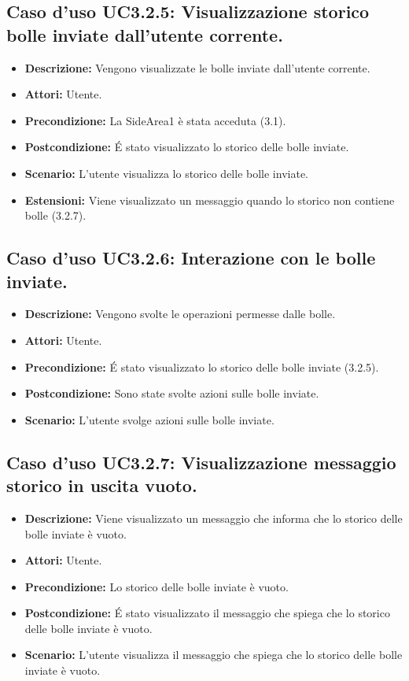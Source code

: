\subsection{Caso d'uso UC3.2.5: Visualizzazione storico bolle inviate dall'utente corrente.}
\begin{itemize}
\item[]\textbf{Descrizione:} Vengono visualizzate le bolle inviate dall'utente corrente.
\item[]\textbf{Attori:} Utente. 
\item[]\textbf{Precondizione:} La SideArea1 è stata acceduta (3.1). 
\item[]\textbf{Postcondizione:} \'E stato visualizzato lo storico delle bolle inviate. 
\item[]\textbf{Scenario:}
L'utente visualizza lo storico delle bolle inviate. 
\item[]\textbf{Estensioni:}
Viene visualizzato un messaggio quando lo storico non contiene bolle (3.2.7). 
\end{itemize}

\subsection{Caso d'uso UC3.2.6: Interazione con le bolle inviate.}
\begin{itemize}
\item[]\textbf{Descrizione:} Vengono svolte le operazioni permesse dalle bolle.
\item[]\textbf{Attori:} Utente. 
\item[]\textbf{Precondizione:} \'E stato visualizzato lo storico delle bolle inviate (3.2.5). 
\item[]\textbf{Postcondizione:} Sono state svolte azioni sulle bolle inviate. 
\item[]\textbf{Scenario:}
L'utente svolge azioni sulle bolle inviate. 
\end{itemize}

\subsection{Caso d'uso UC3.2.7: Visualizzazione messaggio storico in uscita vuoto.}
\begin{itemize}
\item[]\textbf{Descrizione:} Viene visualizzato un messaggio che informa che lo storico delle bolle inviate è vuoto.
\item[]\textbf{Attori:} Utente. 
\item[]\textbf{Precondizione:} Lo storico delle bolle inviate è vuoto. 
\item[]\textbf{Postcondizione:} \'E stato visualizzato il messaggio che spiega che lo storico delle bolle inviate è vuoto. 
\item[]\textbf{Scenario:}
L'utente visualizza il messaggio che spiega che lo storico delle bolle inviate è vuoto. 
\end{itemize}

